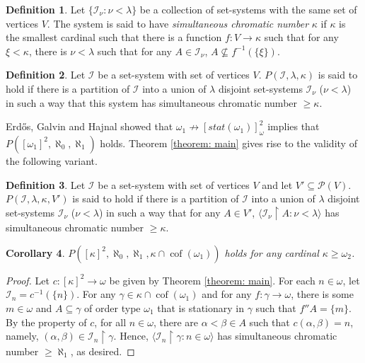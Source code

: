 \documentclass[12pt]{amsart}
\theoremstyle{definition}
\newtheorem{definition}{Definition}[section]
\theoremstyle{plain}
\theoremstyle{plain}
\newtheorem{corollary}[definition]{Corollary}
\DeclareMathOperator{\cof}{cof}
\begin{document}
\begin{definition}\label{definition: simchromatic}
Let $\{\mathcal{I}_{\nu}: \nu<\lambda\}$ be a collection of set-systems with the same set of vertices $V$. The system is said to have \emph{simultaneous chromatic number} $\kappa$ if $\kappa$ is the smallest cardinal such that there is a function $f: V\to \kappa$ such that for any $\xi<\kappa$, there is $\nu<\lambda$ such that for any $A\in \mathcal{I}_\nu$, $A\not\subseteq f^{-1}(\{\xi\})$.
\end{definition}

\begin{definition}
Let $\mathcal{I}$ be a set-system with set of vertices $V$. $P(\mathcal{I},\lambda,\kappa)$ is said to hold if there is a partition of $\mathcal{I}$ into a union of $\lambda$ disjoint set-systems $\mathcal{I}_{\nu}$ ($\nu<\lambda$) in such a way that this system has simultaneous chromatic number $\geq \kappa$.
\end{definition}

Erd\H{o}s, Galvin and Hajnal \cite{ErdosGalvinHajnal} showed that $\omega_1\not\to [stat(\omega_1)]^2_{\omega}$ implies that $P([\omega_1]^2, \aleph_0, \aleph_1)$ holds. Theorem \ref{theorem: main} gives rise to the validity of the following variant.


\begin{definition}
Let $\mathcal{I}$ be a set-system with set of vertices $V$ and let $V'\subseteq \mathcal{P}(V)$. $P(\mathcal{I},\lambda,\kappa, V')$ is said to hold if there is a partition of $\mathcal{I}$ into a union of $\lambda$ disjoint set-systems $\mathcal{I}_{\nu}$ ($\nu<\lambda$) in such a way that for any $A\in V'$, $\langle \mathcal{I}_\nu\restriction A: \nu <\lambda\rangle$ has simultaneous chromatic number $\geq \kappa$.
\end{definition}

\begin{corollary}\label{corollary: set-systems}
 $P([\kappa]^2, \aleph_0, \aleph_1, \kappa\cap \cof(\omega_1))$ holds for any cardinal $\kappa\geq \omega_2$.
\end{corollary}

\begin{proof}
Let $c: [\kappa]^2\to \omega$ be given by Theorem \ref{theorem: main}. For each $n\in \omega$, let $\mathcal{I}_n = c^{-1}(\{n\})$. For any $\gamma\in \kappa\cap \cof(\omega_1)$ and for any $f: \gamma\to \omega$, there is some $m\in \omega$ and $A\subseteq \gamma$ of order type $\omega_1$ that is stationary in $\gamma$ such that $f'' A =\{m\}$. By the property of $c$, for all $n\in \omega$, there are $\alpha<\beta\in A$ such that $c(\alpha,\beta)=n$, namely, $(\alpha,\beta)\in \mathcal{I}_n \restriction \gamma$. Hence, $\langle \mathcal{I}_n\restriction \gamma: n\in \omega\rangle$ has simultaneous chromatic number $\geq \aleph_1$, as desired.
\end{proof}
\end{document}
